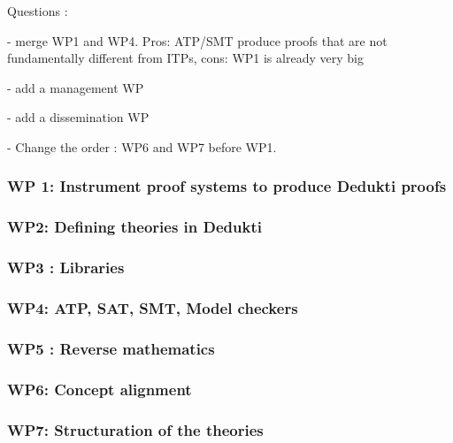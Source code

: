{\color{red}

Questions :

- merge WP1 and WP4. Pros: ATP/SMT produce proofs that are not fundamentally
different from ITPs, cons: WP1 is already very big

- add a management WP

- add a dissemination WP

- Change the order : WP6 and WP7 before WP1.  
}


\subsubsection{WP 1: Instrument proof systems to produce Dedukti proofs}



\subsubsection{WP2: Defining theories in Dedukti}



\subsubsection{WP3 : Libraries}



\subsubsection{WP4: ATP, SAT, SMT, Model checkers}



\subsubsection{WP5 : Reverse mathematics}



\subsubsection{WP6: Concept alignment}



\subsubsection{WP7: Structuration of the theories}





